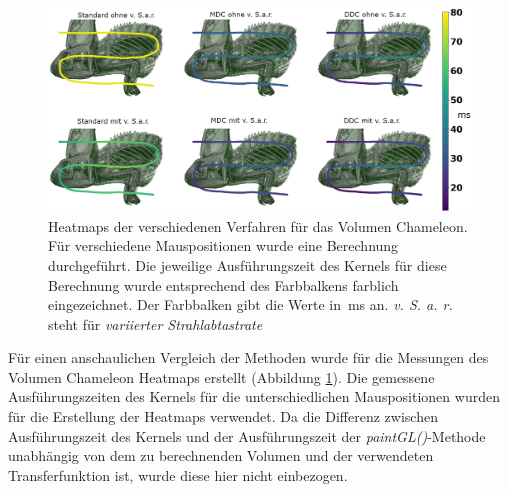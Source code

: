 \begin{figure}
	\centering
	\includegraphics[width=1\textwidth]{../../Neue_Messungen/Chameleon/heatmaps/hm_wa.png}
	\caption{Heatmaps der verschiedenen Verfahren für das Volumen Chameleon. Für verschiedene Mauspositionen wurde eine Berechnung durchgeführt. Die jeweilige Ausführungszeit des Kernels für diese Berechnung wurde entsprechend des Farbbalkens farblich eingezeichnet. Der Farbbalken gibt die Werte in \,ms an. \emph{v. S. a. r.} steht für \emph{variierter Strahlabtastrate}}
	\label{fig::res::pf::hm_wa}
\end{figure}

Für einen anschaulichen Vergleich der Methoden wurde für die Messungen des Volumen Chameleon Heatmaps erstellt (Abbildung \ref{fig::res::pf::hm_wa}).
Die gemessene Ausführungszeiten des Kernels für die unterschiedlichen Mauspositionen wurden für die Erstellung der Heatmaps verwendet.
Da die Differenz zwischen Ausführungszeit des Kernels und der Ausführungszeit der \emph{paintGL()}-Methode unabhängig von dem zu berechnenden Volumen und der verwendeten Transferfunktion ist, wurde diese hier nicht einbezogen.

